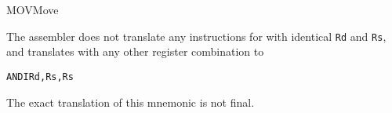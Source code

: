 \begin{instruction}{MOV}{Move}
  \begin{remarks}
The assembler does not translate any instructions for \texttt{\mnemonic} with identical \texttt{Rd} and \texttt{Rs}, and translates \texttt{\mnemonic} with any other register combination to
\begin{alltt}
  ANDI Rd, Rs, Rs
\end{alltt}
  \end{remarks}
  \begin{notice}The exact translation of this mnemonic is not final.\end{notice}
\end{instruction}
